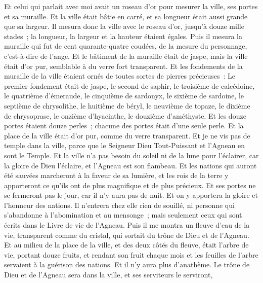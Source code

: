 \begin{multicols}{2}
Et celui qui parlait avec moi avait un roseau d'or pour mesurer la ville, ses portes et sa muraille.
Et la ville était bâtie en carré, et sa longueur était aussi grande que sa largeur. Il mesura donc la ville avec le roseau d'or, jusqu'à douze mille stades~; la longueur, la largeur et la hauteur étaient égales.
Puis il mesura la muraille qui fut de cent quarante-quatre coudées, de la mesure du personnage, c'est-à-dire de l'ange.
Et le bâtiment de la muraille était de jaspe, mais la ville était d'or pur, semblable à du verre fort transparent.
Et les fondements de la muraille de la ville étaient ornés de toutes sortes de pierres précieuses~: Le premier fondement était de jaspe, le second de saphir, le troisième de calcédoine, le quatrième d'émeraude,
le cinquième de sardonyx, le sixième de sardoine, le septième de chrysolithe, le huitième de béryl, le neuvième de topaze, le dixième de chrysoprase, le onzième d'hyacinthe, le douzième d'améthyste.
Et les douze portes étaient douze perles~; chacune des portes était d'une seule perle. Et la place de la ville était d'or pur, comme du verre transparent.
Et je ne vis pas de temple dans la ville, parce que le Seigneur Dieu Tout-Puissant et l'Agneau en sont le Temple.
Et la ville n'a pas besoin du soleil ni de la lune pour l'éclairer, car la gloire de Dieu l'éclaire, et l'Agneau est son flambeau.
Et les nations qui auront été sauvées marcheront à la faveur de sa lumière, et les rois de la terre y apporteront ce qu'ils ont de plus magnifique et de plus précieux.
Et ses portes ne se fermeront pas le jour, car il n'y aura pas de nuit.
Et on y apportera la gloire et l'honneur des nations.
Il n'entrera chez elle rien de souillé, ni personne qui s'abandonne à l'abomination et au mensonge~; mais seulement ceux qui sont écrits dans le Livre de vie de l'Agneau.
\VerseOne{}Puis il me montra un fleuve d'eau de la vie, transparent comme du cristal, qui sortait du trône de Dieu et de l'Agneau.
Et au milieu de la place de la ville, et des deux côtés du fleuve, était l'arbre de vie, portant douze fruits, et rendant son fruit chaque mois et les feuilles de l'arbre servaient à la guérison des nations.
Et il n'y aura plus d'anathème. Le trône de Dieu et de l'Agneau sera dans la ville, et ses serviteurs le serviront,

\end{multicols}
